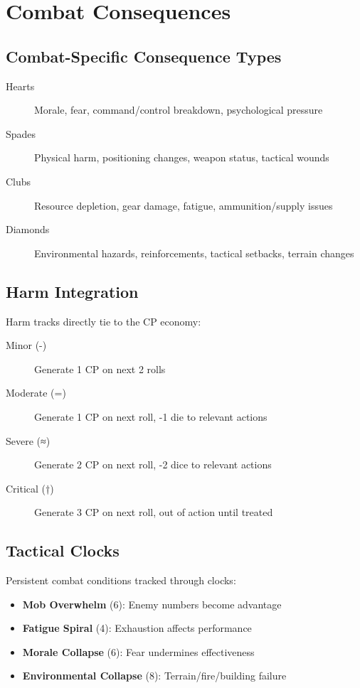 \section{Combat Consequences}

\subsection*{Combat-Specific Consequence Types}
\begin{description}
  \item[Hearts] Morale, fear, command/control breakdown, psychological pressure
  \item[Spades] Physical harm, positioning changes, weapon status, tactical wounds
  \item[Clubs] Resource depletion, gear damage, fatigue, ammunition/supply issues
  \item[Diamonds] Environmental hazards, reinforcements, tactical setbacks, terrain changes
\end{description}


\subsection*{Harm Integration}
Harm tracks directly tie to the CP economy:
\begin{description}
  \item[Minor (-)] Generate 1 CP on next 2 rolls
  \item[Moderate (=)] Generate 1 CP on next roll, -1 die to relevant actions
  \item[Severe (≈)] Generate 2 CP on next roll, -2 dice to relevant actions  
  \item[Critical (†)] Generate 3 CP on next roll, out of action until treated
\end{description}

\subsection*{Tactical Clocks}
Persistent combat conditions tracked through clocks:
\begin{itemize}
  \item \textbf{Mob Overwhelm} (6): Enemy numbers become advantage
  \item \textbf{Fatigue Spiral} (4): Exhaustion affects performance
  \item \textbf{Morale Collapse} (6): Fear undermines effectiveness
  \item \textbf{Environmental Collapse} (8): Terrain/fire/building failure
\end{itemize}

